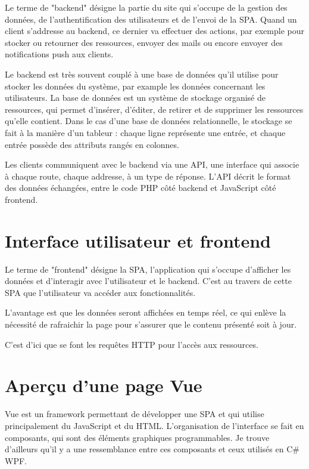 \documentclass[
    iai, %
    eai, %
]{heig-tb}
\begin{document}
Le terme de "backend" désigne la partie du site qui s'occupe de la gestion des données, de l'authentification des utilisateurs et de l'envoi de la SPA.
Quand un client s'addresse au backend, ce dernier va effectuer des actions, par exemple pour stocker ou retourner des ressources, envoyer des mails ou encore envoyer des notifications push aux clients.

Le backend est très souvent couplé à une base de données qu'il utilise pour stocker les données du système, par example les données concernant les utilisateurs.
La base de données est un système de stockage organisé de ressources, qui permet d'insérer, d'éditer, de retirer et de supprimer les ressources qu'elle contient.
Dans le cas d'une base de données relationnelle, le stockage se fait à la manière d'un tableur : chaque ligne représente une entrée, et chaque entrée possède des attributs rangés en colonnes.

Les clients communiquent avec le backend via une API, une interface qui associe à chaque route, chaque addresse, à un type de réponse.
L'API décrit le format des données échangées, entre le code PHP côté backend et JavaScript côté frontend.


\section{Interface utilisateur et frontend}

Le terme de "frontend" désigne la SPA, l'application qui s'occupe d'afficher les données et d'interagir avec l'utilisateur et le backend.
C'est au travers de cette SPA que l'utilisateur va accéder aux fonctionnalités.

L'avantage est que les données seront affichées en temps réel, ce qui enlève la nécessité de rafraichir la page pour s'assurer que le contenu présenté soit à jour.

C'est d'ici que se font les requêtes HTTP pour l'accès aux ressources.

\section{Aperçu d'une page Vue}
Vue est un framework permettant de développer une SPA et qui utilise principalement du JavaScript et du HTML.
L'organisation de l'interface se fait en composants, qui sont des éléments graphiques programmables.
Je trouve d'ailleurs qu'il y a une ressemblance entre ces composants et ceux utilisés en C\# WPF.
\end{document}
